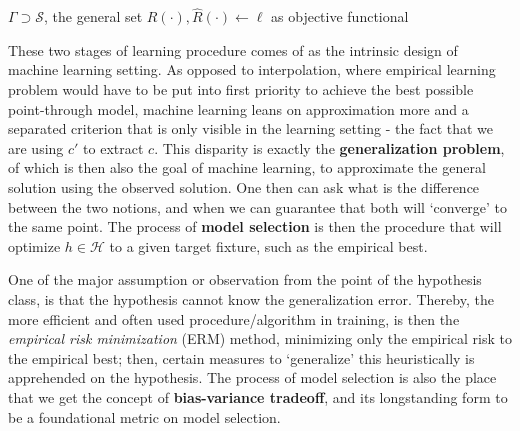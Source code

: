 \documentclass[
  journal=largetwo,
  year=2025,
  volume=37,
]{cup-journal}
\begin{document}
\begin{algorithm}[htb]
    \renewcommand{\algorithmcfname}{Optimization problem}
    \caption{Empirical-generalization learning dynamics (non-proxy)}
    \Begin
    {
        $\Gamma\supset \mathcal{S}$, the general set\;
        $R(\cdot),\hat{R}(\cdot)\gets\ell$ as objective functional\;
    }
    \label{algo:algo_optim_ideal}
\end{algorithm}

These two stages of learning procedure comes of as the intrinsic design of machine learning setting. As opposed to interpolation, where empirical learning problem would have to be put into first priority to achieve the best possible point-through model, machine learning leans on approximation more and a separated criterion that is only visible in the learning setting - the fact that we are using $c'$ to extract $c$. This disparity is exactly the \textbf{generalization problem}, of which is then also the goal of machine learning, to approximate the general solution using the observed solution. One then can ask what is the difference between the two notions, and when we can guarantee that both will `converge' to the same point. The process of \textbf{model selection} is then the procedure that will optimize $h\in \mathcal{H}$ to a given target fixture, such as the empirical best. 

One of the major assumption or observation from the point of the hypothesis class, is that the hypothesis cannot know the generalization error. Thereby, the more efficient and often used procedure/algorithm in training, is then the \textit{empirical risk minimization} (ERM) method, minimizing only the empirical risk to the empirical best; then, certain measures to `generalize' this heuristically is apprehended on the hypothesis. The process of model selection is also the place that we get the concept of \textbf{bias-variance tradeoff}, and its longstanding form to be a foundational metric on model selection. 
\end{document}
